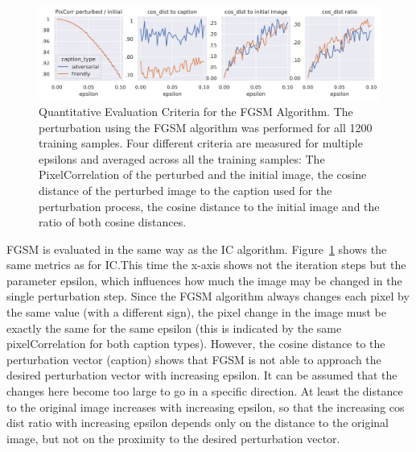 \begin{figure}[ht]
    \centering
    \includegraphics[width=1\textwidth]{plots/advpert_validation_fgsm_loss_curves.png}
    \caption[Quantitative Evaluation Criteria for the FGSM Algorithm]{Quantitative Evaluation Criteria for the FGSM Algorithm. The perturbation using the FGSM algorithm was performed for all 1200 training samples. Four different criteria are measured for multiple epsilons and averaged across all the training samples: The PixelCorrelation of the perturbed and the initial image, the cosine distance of the perturbed image to the caption used for the perturbation process, the cosine distance to the initial image and the ratio of both cosine distances.}\label{fig:advpert_validation_fgsm_loss_curves}
\end{figure}

FGSM is evaluated in the same way as the IC algorithm. Figure~\ref{fig:advpert_validation_fgsm_loss_curves} shows the same metrics as for IC.\@ This time the x-axis shows not the iteration steps but the parameter epsilon, which influences how much the image may be changed in the single perturbation step. Since the FGSM algorithm always changes each pixel by the same value (with a different sign), the pixel change in the image must be exactly the same for the same epsilon (this is indicated by the same pixelCorrelation for both caption types). However, the cosine distance to the perturbation vector (caption) shows that FGSM is not able to approach the desired perturbation vector with increasing epsilon. It can be assumed that the changes here become too large to go in a specific direction. At least the distance to the original image increases with increasing epsilon, so that the increasing cos dist ratio with increasing epsilon depends only on the distance to the original image, but not on the proximity to the desired perturbation vector. 

